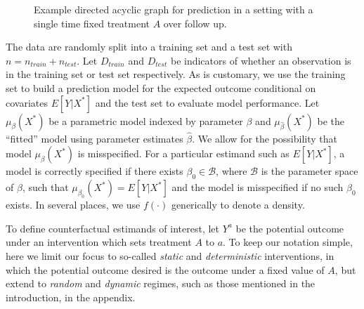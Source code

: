 \begin{figure}[t]
    \centering
    \caption{Example directed acyclic graph for prediction in a setting with a single time fixed treatment $A$ over follow up.}
    \label{fig:dag1}
\end{figure}

The data are randomly split into a training set and a test set with $n = n_{train} + n_{test}$. Let $D_{train}$ and $D_{test}$ be indicators of whether an observation is in the training set or test set respectively. As is customary, we use the training set to build a prediction model for the expected outcome conditional on covariates $E[Y| X^*]$ and the test set to evaluate model performance. Let $\mu_{\beta}(X^*)$ be a parametric model indexed by parameter $\beta$ and $\mu_{\widehat{\beta}}(X^*)$ be the ``fitted'' model using parameter estimates $\widehat{\beta}$. We allow for the possibility that model $\mu_{\beta}(X^*)$ is misspecified. For a particular estimand such as $E[Y | X^*]$, a model is correctly specified if there exists $\beta_0 \in \mathcal{B}$, where $\mathcal{B}$ is the parameter space of $\beta$, such that $\mu_{\beta_0}(X^*) = E[Y | X^*]$ and the model is misspecified if no such $\beta_0$ exists.  In several places, we use $f(\cdot)$ generically to denote a density.

To define counterfactual estimands of interest, let $Y^a$ be the potential outcome under an intervention which sets treatment $A$ to $a$. To keep our notation simple, here we limit our focus to so-called \textit{static} and \textit{deterministic} interventions, in which the potential outcome desired is the outcome under a fixed value of $A$, but extend to \textit{random} and \textit{dynamic} regimes, such as those mentioned in the introduction, in the appendix. 

